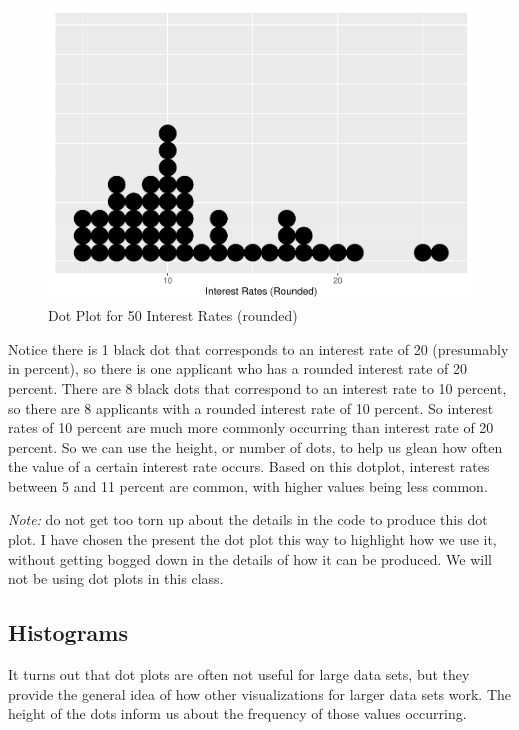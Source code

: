 \documentclass[
]{book}
\begin{document}
\begin{figure}
\centering
\includegraphics{bookdown-demo_files/figure-latex/dotplot-1.pdf}
\caption{\label{fig:dotplot}Dot Plot for 50 Interest Rates (rounded)}
\end{figure}

Notice there is 1 black dot that corresponds to an interest rate of 20 (presumably in percent), so there is one applicant who has a rounded interest rate of 20 percent. There are 8 black dots that correspond to an interest rate to 10 percent, so there are 8 applicants with a rounded interest rate of 10 percent. So interest rates of 10 percent are much more commonly occurring than interest rate of 20 percent. So we can use the height, or number of dots, to help us glean how often the value of a certain interest rate occurs. Based on this dotplot, interest rates between 5 and 11 percent are common, with higher values being less common.

\emph{Note:} do not get too torn up about the details in the code to produce this dot plot. I have chosen the present the dot plot this way to highlight how we use it, without getting bogged down in the details of how it can be produced. We will not be using dot plots in this class.

\hypertarget{histograms}{%
\subsection{Histograms}\label{histograms}}

It turns out that dot plots are often not useful for large data sets, but they provide the general idea of how other visualizations for larger data sets work. The height of the dots inform us about the frequency of those values occurring.
\end{document}

